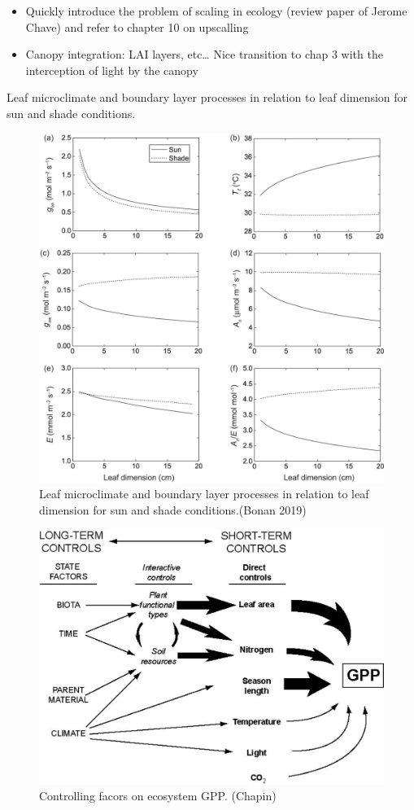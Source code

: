 \documentclass[
  oneside]{book}
\providecommand{\tightlist}{%
  \setlength{\itemsep}{0pt}\setlength{\parskip}{0pt}}
\begin{document}
\begin{itemize}
\tightlist
\item
  Quickly introduce the problem of scaling in ecology (review paper of Jerome Chave) and refer to chapter 10 on upscalling
\item
  Canopy integration: LAI layers, etc\ldots{} Nice transition to chap 3 with the interception of light by the canopy
\end{itemize}

Leaf microclimate and boundary layer processes in relation to leaf dimension for sun and shade conditions.

\begin{figure}

{\centering \includegraphics[width=0.8\linewidth]{figures/chap2/sun_shade} 

}

\caption{Leaf microclimate and boundary layer processes in relation to leaf dimension for sun and shade conditions.(Bonan 2019)}\label{fig:f221}
\end{figure}

\begin{figure}

{\centering \includegraphics[width=0.8\linewidth]{figures/chap2/GPPcontrols} 

}

\caption{Controlling facors on ecosystem GPP. (Chapin)}\label{fig:f222}
\end{figure}
\end{document}

